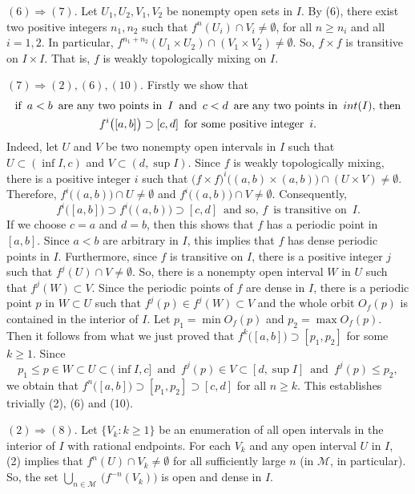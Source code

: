 \documentclass[12pt]{article}
\begin{document}
${(6)} \Rightarrow {(7)}$.  Let $U_1, U_2, V_1, V_2$ be nonempty open sets in $I$.  By {(6)}, there exist two positive integers $n_1, n_2$ such that $f^n(U_i) \cap V_i \ne \emptyset$, for all $n \ge n_i$ and all $i = 1, 2$.  In particular, $f^{n_1+n_2}(U_1 \times U_2) \cap (V_1 \times V_2) \ne \emptyset$.  So, $f \times f$ is transitive on $I \times I$.  That is, $f$ is weakly topologically mixing on $I$.  

${(7)} \Rightarrow {(2), (6), (10)}$.  Firstly we show that\begin{multline*}$$\text{if} \,\,\, a < b \,\,\, \text{are any two points in} \,\,\,I \,\,\, \text{and} \,\,\, c < d \,\,\, \text{are any two points in} \,\,\, int(I), \, \text{then} \\ f^i\big([a, b]\big) \supset [c, d] \,\,\, \text{for some positive integer} \,\,\, i.$$\end{multline*}Indeed, let $U$ and $V$ be two nonempty open intervals in $I$ such that $U \subset (\inf I, c)$ and $V \subset (d, \sup I)$.  Since $f$ is weakly topologically mixing, there is a positive integer $i$ such that $\big(f \times f\big)^i\big((a, b) \times (a, b)\big) \cap (U \times V) \ne \emptyset$.  Therefore, $f^i\big((a, b)\big) \cap U \ne \emptyset$ and $f^i\big((a, b)\big) \cap V \ne \emptyset$.  Consequently,
$$
f^i\big([a, b]\big) \supset f^i\big((a, b)\big) \supset [c, d] \,\,\, \text{and so}, \, f \,\,\, \text{is transitive on} \,\,\, I.
$$
If we choose $c = a$ and $d = b$, then this shows that $f$ has a periodic point in $[a, b]$.  Since $a < b$ are arbitrary in $I$, this implies that $f$ has dense periodic points in $I$.  Furthermore, since $f$ is transitive on $I$, there is a positive integer $j$ such that $f^j(U) \cap V \ne \emptyset$.  So, there is a nonempty open interval $W$ in $U$ such that $f^j(W) \subset V$.  Since the periodic points of $f$ are dense in $I$, there is a periodic point $p$ in $W \subset U$ such that $f^j(p) \in f^j(W) \subset V$ and the whole orbit $O_f(p)$ is contained in the interior of $I$.  Let $p_1 = \min O_f(p)$ and $p_2 = \max O_f(p)$.  Then it follows from what we just proved that $f^k\big([a, b]\big) \supset [p_1, p_2]$ for some $k \ge 1$.  Since
$$
p_1 \le p \in W \subset U \subset (\inf I, c] \,\,\, \text{and} \,\,\, f^j(p) \in V \subset [d, \sup I] \,\,\, \text{and} \,\,\, f^j(p) \le p_2,
$$
we obtain that $f^n\big([a, b]\big) \supset [p_1, p_2] \supset [c, d]$ for all $n \ge k$.  This establishes trivially {(2), (6)} and {(10)}.  

${(2)} \Rightarrow (8)$.  Let $\big\{ V_k : k \ge 1 \big\}$ be an enumeration of all open intervals in the interior of $I$ with rational endpoints.  For each $V_k$ and any open interval $U$ in $I$, (2) implies that $f^n(U) \cap V_k \ne \emptyset$ for all sufficiently large $n$ (in $\mathcal M$, in particular).  So, the set $\bigcup_{n \in \mathcal M} \, \big(f^{-n}(V_k)\big)$ is open and dense in $I$.  
\end{document}
